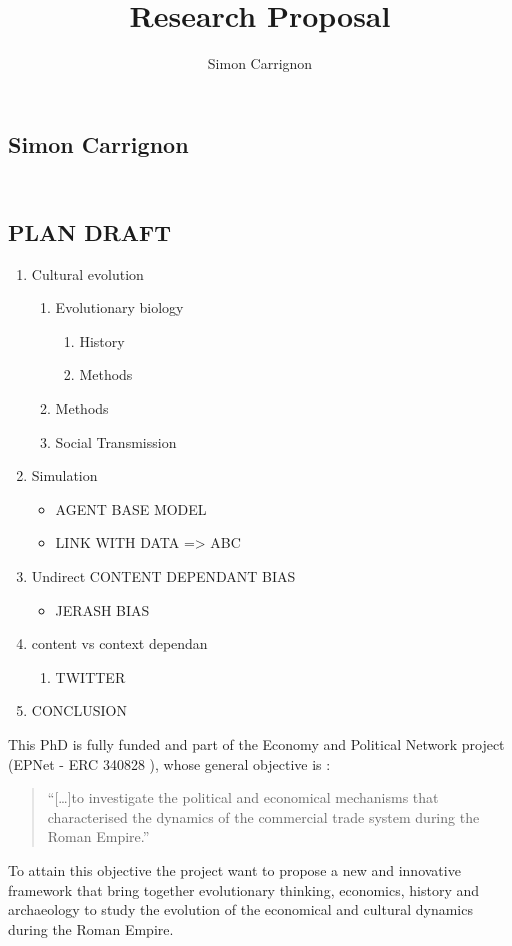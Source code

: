 \documentclass[a4paper]{article}
\title{Research Proposal}
\author{Simon Carrignon}
\begin{document}
\subsection*{Simon Carrignon}
\subsection*{\\ PLAN DRAFT}


\begin{enumerate}
    \item Cultural evolution
        \begin{enumerate}
            \item Evolutionary biology
                \begin{enumerate}
                    \item History
                    \item Methods
                \end{enumerate}
            \item Methods
            \item Social Transmission
        \end{enumerate}
    \item Simulation
        \begin{itemize}
            \item AGENT BASE MODEL
            \item LINK WITH DATA => ABC
        \end{itemize}
    \item Undirect CONTENT DEPENDANT BIAS
        \begin{itemize}
            \item JERASH BIAS
        \end{itemize}
    \item content vs context dependan
        \begin{enumerate}
            \item TWITTER
        \end{enumerate}
    \item CONCLUSION
       
\end{enumerate}

This PhD is fully funded and part of the Economy and Political Network project (EPNet - ERC 340828 ), whose general objective is :
\begin{quote}
	``[\ldots]to investigate the political and economical mechanisms that characterised the dynamics of the commercial trade system during the Roman Empire.''
\end{quote}
To attain this objective the project want to propose a new and innovative framework that bring together evolutionary thinking, economics, history and archaeology to study the evolution of the economical and cultural dynamics during the Roman Empire. 
\end{document}
